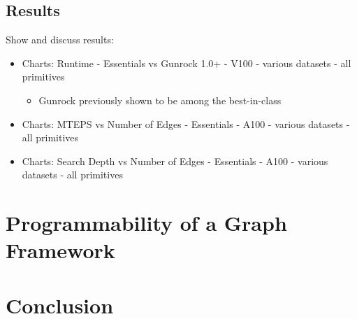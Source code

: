 \documentclass[11pt,a4paper]{article}
\begin{document}
\subsection{Results}
Show and discuss results:
\begin{itemize}
    \item Charts: Runtime - Essentials vs Gunrock 1.0+ - V100 - various datasets - all primitives
    \begin{itemize}
        \item Gunrock previously shown to be among the best-in-class \cite{Wang:2017:GGG}
    \end{itemize}
    \item Charts: MTEPS vs Number of Edges - Essentials - A100 - various datasets - all primitives
    \item Charts: Search Depth vs Number of Edges - Essentials - A100 - various datasets - all primitives
\end{itemize}
\section{Programmability of a Graph Framework}
\section{Conclusion}
\printbibliography
\end{document}
